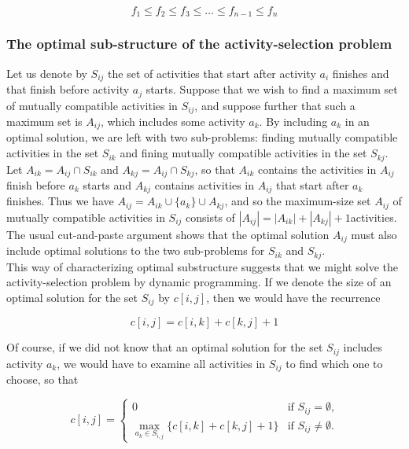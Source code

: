 \documentclass[12pt]{article}
\begin{document}
\begin{equation*}
  f_1 \le f_2 \le f_3 \le \dots \le f_{n-1} \le f_n
\end{equation*}

\subsubsection*{The optimal sub-structure of the activity-selection problem}

Let us denote by $S_{ij}$ the set of activities that start after activity $a_i$ finishes and that finish before activity $a_j$ starts. Suppose that we wish to find a maximum set of mutually compatible activities in $S_{ij}$, and suppose further that such a maximum set is $A_{ij}$, which includes some activity $a_k$. By including $a_k$ in an optimal solution, we are left with two sub-problems: finding mutually compatible activities in the set $S_{ik}$ and fining mutually compatible activities in the set $S_{kj}$. Let $A_{ik} = A_{ij} \cap S_{ik}$ and $A_{kj} = A_{ij} \cap S_{kj}$, so that $A_{ik}$ contains the activities in $A_{ij}$ finish before $a_k$ starts and $A_{kj}$ contains activities in $A_{ij}$ that start after $a_k$ finishes. Thus we have $A_{ij} = A_{ik} \cup \{ a_k \} \cup A_{kj}$, and so the maximum-size set $A_{ij}$ of mutually compatible activities in $S_{ij}$ consists of $|A_{ij}| = |A_{ik}| + |A_{kj}| + 1$activities. \\

The usual cut-and-paste argument shows that the optimal solution $A_{ij}$ must also include optimal solutions to the two sub-problems for $S_{ik}$ and $S_{kj}$. \\

This way of characterizing optimal substructure suggests that we might solve the activity-selection problem by dynamic programming. If we denote the size of an optimal solution for the set $S_{ij}$ by $c[i,j]$, then we would have the recurrence

\begin{equation*}
  c[i,j] = c[i,k] + c[k,j] + 1
\end{equation*}

Of course, if we did not know that an optimal solution for the set $S_{ij}$ includes activity $a_k$, we would have to examine all activities in $S_{ij}$ to find which one to choose, so that

\begin{equation*}
  c[i,j] =
  \begin{cases}
    0 & \text{if $S_{ij} = \emptyset$,} \\
    \max_{a_k \in S_{i,j}} \{ c[i,k] + c[k,j] + 1\} & \text{if $S_{ij} \neq \emptyset$.}
  \end{cases}
\end{equation*}
\end{document}
